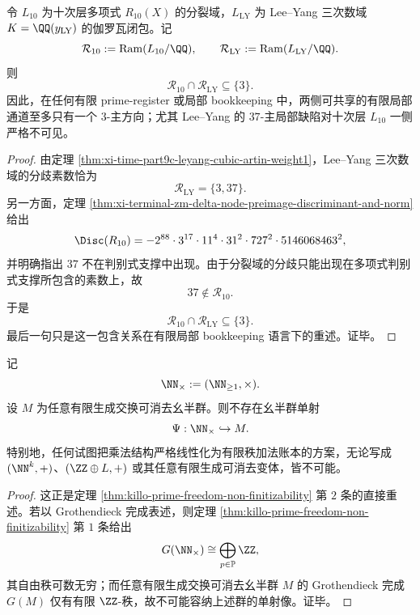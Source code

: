 \begin{theorem}\label{thm:conclusion-common-local-ramification-only-3}
令 \(L_{10}\) 为十次层多项式 \(R_{10}(X)\) 的分裂域，\(L_{\mathrm{LY}}\) 为 Lee--Yang 三次数域 \(K=\QQ(y_{\mathrm{LY}})\) 的伽罗瓦闭包。记
\[
\mathcal R_{10}:=\mathrm{Ram}(L_{10}/\QQ),
\qquad
\mathcal R_{\mathrm{LY}}:=\mathrm{Ram}(L_{\mathrm{LY}}/\QQ).
\]
则
\[
\mathcal R_{10}\cap \mathcal R_{\mathrm{LY}}\subseteq \{3\}.
\]
因此，在任何有限 prime-register 或局部 bookkeeping 中，两侧可共享的有限局部通道至多只有一个 \(3\)-主方向；尤其 Lee--Yang 的 \(37\)-主局部缺陷对十次层 \(L_{10}\) 一侧严格不可见。
\end{theorem}
\begin{proof}
由定理 \ref{thm:xi-time-part9c-leyang-cubic-artin-weight1}，Lee--Yang 三次数域的分歧素数恰为
\[
\mathcal R_{\mathrm{LY}}=\{3,37\}.
\]
另一方面，定理 \ref{thm:xi-terminal-zm-delta-node-preimage-discriminant-and-norm} 给出
\[
\Disc(R_{10})=-2^{88}\cdot 3^{17}\cdot 11^{4}\cdot 31^{2}\cdot 727^{2}\cdot 5146068463^{2},
\]
并明确指出 \(37\) 不在判别式支撑中出现。由于分裂域的分歧只能出现在多项式判别式支撑所包含的素数上，故
\[
37\notin \mathcal R_{10}.
\]
于是
\[
\mathcal R_{10}\cap \mathcal R_{\mathrm{LY}}\subseteq \{3\}.
\]
最后一句只是这一包含关系在有限局部 bookkeeping 语言下的重述。证毕。
\end{proof}

\begin{theorem}[有限秩加性影子的统一障碍]\label{thm:conclusion-finite-rank-additive-shadow-obstruction}
记
\[
\NN_{\times}:=(\NN_{\ge 1},\times).
\]
设 \(M\) 为任意有限生成交换可消去幺半群。则不存在幺半群单射
\[
\Psi:\NN_{\times}\hookrightarrow M.
\]
特别地，任何试图把乘法结构严格线性化为有限秩加法账本的方案，无论写成 \((\NN^k,+)\)、\((\ZZ\oplus L,+)\) 或其任意有限生成可消去变体，皆不可能。
\end{theorem}
\begin{proof}
这正是定理 \ref{thm:killo-prime-freedom-non-finitizability} 第 \(2\) 条的直接重述。若以 Grothendieck 完成表述，则定理 \ref{thm:killo-prime-freedom-non-finitizability} 第 \(1\) 条给出
\[
G(\NN_{\times})\cong \bigoplus_{p\in\mathbb P}\ZZ,
\]
其自由秩可数无穷；而任意有限生成交换可消去幺半群 \(M\) 的 Grothendieck 完成 \(G(M)\) 仅有有限 \(\ZZ\)-秩，故不可能容纳上述群的单射像。证毕。
\end{proof}

